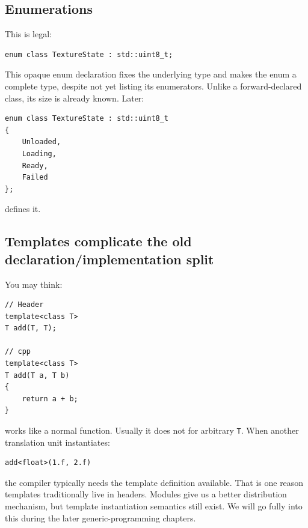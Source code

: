 \subsection{Enumerations}\label{05-engine-i-ch002-enumerations}

\hypertarget{05-engine-i-ch002-enumerations}{}

This is legal:

\begin{verbatim}
enum class TextureState : std::uint8_t;
\end{verbatim}

This opaque enum declaration fixes the underlying type and makes the enum a complete type, despite not yet listing its enumerators. Unlike a forward-declared class, its size is already known. Later:

\begin{verbatim}
enum class TextureState : std::uint8_t
{
    Unloaded,
    Loading,
    Ready,
    Failed
};
\end{verbatim}

defines it.

\subsection{Templates complicate the old declaration/implementation split}\label{05-engine-i-ch002-templates-complicate-the-old-declarationimplementation-split}

\hypertarget{05-engine-i-ch002-templates-complicate-the-old-declarationimplementation-split}{}

You may think:

\begin{verbatim}
// Header
template<class T>
T add(T, T);

// cpp
template<class T>
T add(T a, T b)
{
    return a + b;
}
\end{verbatim}

works like a normal function. Usually it does not for arbitrary \texttt{T}. When another translation unit instantiates:

\begin{verbatim}
add<float>(1.f, 2.f)
\end{verbatim}

the compiler typically needs the template definition available. That is one reason templates traditionally live in headers. Modules give us a better distribution mechanism, but template instantiation semantics still exist. We will go fully into this during the later generic-programming chapters.

